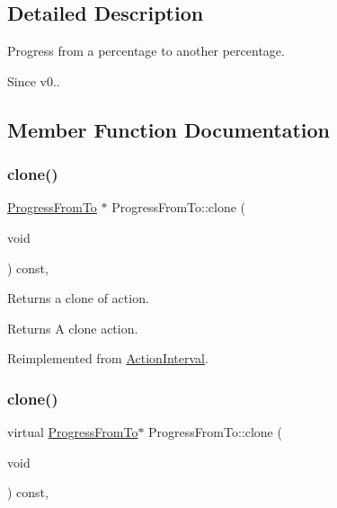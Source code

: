\subsection{Detailed Description}
Progress from a percentage to another percentage. 

\begin{DoxySince}{Since}
v0.. 
\end{DoxySince}


\subsection{Member Function Documentation}
\mbox{\label{classProgressFromTo_a0ac214f0a34b42f2d6c303a37e7026db}} 
\subsubsection{\texorpdfstring{clone()}{clone()}\hspace{0.1cm}{\footnotesize\ttfamily [1/2]}}
{\footnotesize\ttfamily \hyperlink{classProgressFromTo}{Progress\+From\+To} $\ast$ Progress\+From\+To\+::clone (\begin{DoxyParamCaption}\item[{void}]{ }\end{DoxyParamCaption}) const\hspace{0.3cm}{\ttfamily [override]}, {\ttfamily [virtual]}}

Returns a clone of action.

\begin{DoxyReturn}{Returns}
A clone action. 
\end{DoxyReturn}


Reimplemented from \hyperlink{classActionInterval_abc93ce0c2f54a90eb216a7803f25f44a}{Action\+Interval}.

\mbox{\label{classProgressFromTo_a86d0e65030755a5e7f96df76e8f87e2a}} 
\subsubsection{\texorpdfstring{clone()}{clone()}\hspace{0.1cm}{\footnotesize\ttfamily [2/2]}}
{\footnotesize\ttfamily virtual \hyperlink{classProgressFromTo}{Progress\+From\+To}$\ast$ Progress\+From\+To\+::clone (\begin{DoxyParamCaption}\item[{void}]{ }\end{DoxyParamCaption}) const\hspace{0.3cm}{\ttfamily [override]}, {\ttfamily [virtual]}}

